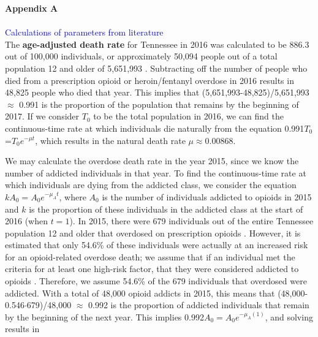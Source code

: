 \documentclass[12pt]{article}
\begin{document}
\textbf{Appendix A} \\ \\
\textcolor{blue}{Calculations of parameters from literature} \\
The \textbf{age-adjusted death rate} for Tennessee in 2016 was calculated to be 886.3 out of 100,000 individuals, or approximately 50,094 people out of a total population 12 and older of 5,651,993 \cite{Kaiser}. Subtracting off the number of people who died from a prescription opioid or heroin/fentanyl overdose in 2016 results in 48,825 people who died that year. This implies that (5,651,993-48,825)/5,651,993 $\approx$ 0.991 is the proportion of the population that remains by the beginning of 2017. If we consider $T_0$ to be the total population in 2016, we can find the continuous-time rate at which individuals die naturally from the equation 0.991$T_0$=$T_0e^{-\mu t}$, which results in the natural death rate $\mu \approx 0.00868$.



We may calculate the overdose death rate in the year 2015, since we know the number of addicted individuals in that year. To find the continuous-time rate at which individuals are dying from the addicted class, we consider the equation $k A_{0}=A_{0}e^{-\mu_{A}t}$, where $A_0$ is the number of individuals addicted to opioids in 2015 and $k$ is the proportion of these individuals in the addicted class at the start of 2016 (when $t=1$). In 2015, there were 679 individuals out of the entire Tennessee population 12 and older that overdosed on prescription opioids \cite{PDO}. However, it is estimated that only 54.6\% of these individuals were actually at an increased risk for an opioid-related overdose death; we assume that if an individual met the criteria for at least one high-risk factor, that they were considered addicted to opioids \cite{Gwira}. Therefore, we assume 54.6\% of the 679 individuals that overdosed were addicted. With a total of 48,000 opioid addicts in 2015, this means that (48,000-0.546$\cdot$679)/48,000 $\approx$ 0.992 is the proportion of addicted individuals that remain by the beginning of the next year. This implies 0.992$A_0=A_0 e^{-\mu_{A}(1)}$, and solving results in \unboldmath
\end{document}
